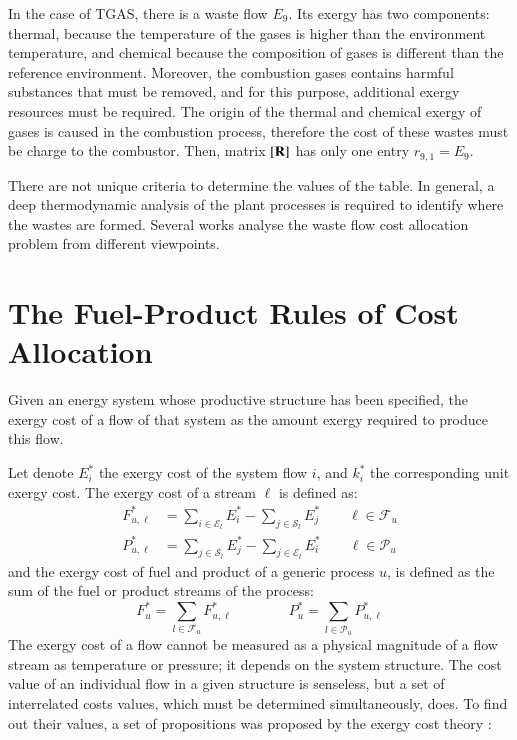 \documentclass{ecos2018}
\begin{document}
In the case of TGAS, there is a waste flow $E_9$. Its exergy has two components: thermal, because the  temperature of the gases is higher than the environment temperature, and chemical because the composition of gases is different than the reference environment. Moreover, the combustion gases contains harmful substances that must be removed, and for this purpose, additional exergy resources must be required. The origin of the thermal and chemical exergy of gases is caused in the combustion process, therefore the cost of these wastes must be charge to the combustor. Then, matrix $\left[ \textbf{R} \right]$ has only one entry $r_{9,1}=E_9$.

There are not unique criteria to determine the values of the  table. In general, a deep thermodynamic analysis of the plant processes is required to identify where the wastes are formed. Several works \cite{Frangopoulos87,Gonzalez03,Mendes17} analyse the waste flow cost allocation problem from different viewpoints.

\section{The Fuel-Product Rules of Cost Allocation}
Given an energy system whose productive structure has been specified, the exergy cost of a flow of that system as the amount exergy required to produce this flow.

Let denote $E_i^*$ the exergy cost of the system flow $i$, and $k_i^*$ the corresponding unit exergy cost. The exergy cost of a stream $\ell$ is defined as:
\begin{align}
F_{u,\ell}^{*}&=\sum_{i\in\mathcal{E}_l}{E_i^*}-\sum_{j\in\mathcal{S}_l}{E_j^*} \qquad \ell\in\mathcal{F}_u \\
P_{u,\ell}^{*}&=\sum_{j\in\mathcal{S}_l}{E_j^*}-\sum_{j\in\mathcal{E}_l}{E_i^*} \qquad \ell\in\mathcal{P}_u
\end{align}
and the exergy cost of fuel and product of a generic process $u$, is defined as the sum of the fuel or product streams of the process:
\begin{equation}
F_{u}^{*}=\sum_{l\in\mathcal{F}_u}{F_{u,\ell}^{*}} \qquad \qquad
P_{u}^{*}=\sum_{l\in\mathcal{P}_u}{P_{u,\ell}^{*}}
\end{equation}
The exergy cost of a flow cannot be measured as a physical magnitude of a flow stream as temperature or pressure; it depends on the system structure. The cost value of an individual flow in a given structure is senseless, but a set of interrelated costs values, which must be determined simultaneously, does. To find out their values, a set of propositions was proposed by the exergy cost theory \cite{Valero1986}:
\end{document}

